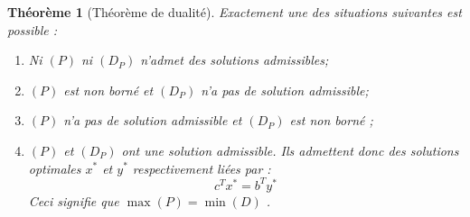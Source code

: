\documentclass[11pt]{report}
\newenvironment{boxtheorem}
{\begin{tcolorbox}
		[enhanced jigsaw,breakable,pad at break*=2mm,
		colback=black!5,colframe=bleueLeger]}
	{\end{tcolorbox}}
\theoremstyle{styletheorem}
\newtheorem{theoreme}{Théorème}[section]
\newenvironment{theorem}
{\vspace*{0.3cm}\begin{boxtheorem}\begin{theoreme}}{\end{theoreme}\end{boxtheorem}\vspace*{0.3cm}}
\theoremstyle{styledef}
\theoremstyle{remark}
\begin{document}
\begin{theorem}[Théorème de dualité]
	Exactement une des situations suivantes est possible : 
	\begin{enumerate}[label =$\bullet$]
		
		\item Ni $(P)$ ni $(D_P)$ n'admet des solutions admissibles;
		
		\item $(P)$ est non borné et $(D_P)$ n'a pas de solution admissible;
		
		\item $(P)$ n'a pas de solution admissible et $(D_P)$ est non borné ;
		
		
		\item $(P)$ et $(D_P)$ ont une solution admissible. Ils admettent donc des solutions optimales $x^*$ et $y^*$ respectivement liées par :
		$$c^T x^* = b^T y^*$$
		Ceci signifie que $\max (P) = \min (D)$ \cite{b1}.
	\end{enumerate}
\end{theorem}
\end{document}
